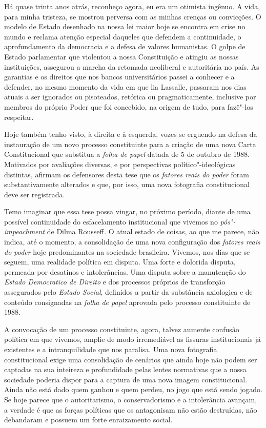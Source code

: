 Há quase trinta anos atrás, reconheço agora, eu era um otimista ingênuo.
A vida, para minha tristeza, se mostrou perversa com as minhas crenças
ou convicções. O modelo de Estado desenhado na nossa lei maior hoje se
encontra em crise no mundo e reclama atenção especial daqueles que
defendem a continuidade, o aprofundamento da democracia e a defesa de
valores humanistas. O golpe de Estado parlamentar que violentou a nossa
Constituição e atingiu as nossas instituições, assegurou a marcha da
retomada neoliberal e autoritária no país. As garantias e os direitos
que nos bancos universitários passei a conhecer e a defender, no mesmo
momento da vida em que lia Lassalle, passaram nos dias atuais a ser
ignorados ou pisoteados, retórica ou pragmaticamente, inclusive por
membros do próprio Poder que foi concebido, na origem de tudo, para
fazê"-los respeitar.

Hoje também tenho visto, à direita e à esquerda, vozes se erguendo na
defesa da instauração de um novo processo constituinte para a criação de
uma nova Carta Constitucional que substitua a \emph{folha de papel}
datada de 5 de outubro de 1988. Motivados por avaliações diversas, e por
perspectivas político"-ideológicas distintas, afirmam os defensores desta
tese que os \emph{fatores reais do poder} foram substantivamente
alterados e que, por isso, uma nova fotografia constitucional deve ser
registrada.

Temo imaginar que essa tese possa vingar, no próximo período, diante de
uma possível continuidade do esfacelamento institucional que vivemos no
\emph{pós"-impeachment} de Dilma Rousseff\emph{.} O atual estado de
coisas, ao que me parece, não indica, até o momento, a consolidação de
uma nova configuração dos \emph{fatores reais do poder} hoje
predominantes na sociedade brasileira. Vivemos, nos dias que se seguem,
uma realidade política em disputa. Uma forte e dolorida disputa,
permeada por desatinos e intolerâncias. Uma disputa sobre a manutenção
do \emph{Estado Democratico de Direito} e dos processos próprios de
transforção assegurados pelo \emph{Estado Social}, definidos a partir da
substância axiologica e de conteúdo consignadas na \emph{folha de papel}
aprovada pelo processo constituinte de 1988.

A convocação de um processo constituinte, agora, talvez aumente confusão
política em que vivemos, amplie de modo irremediável as fissuras
institucionais já existentes e a intranquilidade que nos paralisa. Uma
nova fotografia constitucional exige uma consolidação de cenários que
ainda hoje não podem ser captadas na sua inteireza e profundidade pelas
lentes normativas que a nossa sociedade poderia dispor para a captura de
uma nova imagem constitucional. Ainda não está dado quem ganhou e quem
perdeu, no jogo que está sendo jogado. Se hoje parece que o
autoritarismo, o conservadorismo e a intolerância avançam, a verdade é
que as forças políticas que os antagonisam não estão destruídas, não
debandaram e possuem um forte enraizamento social.

